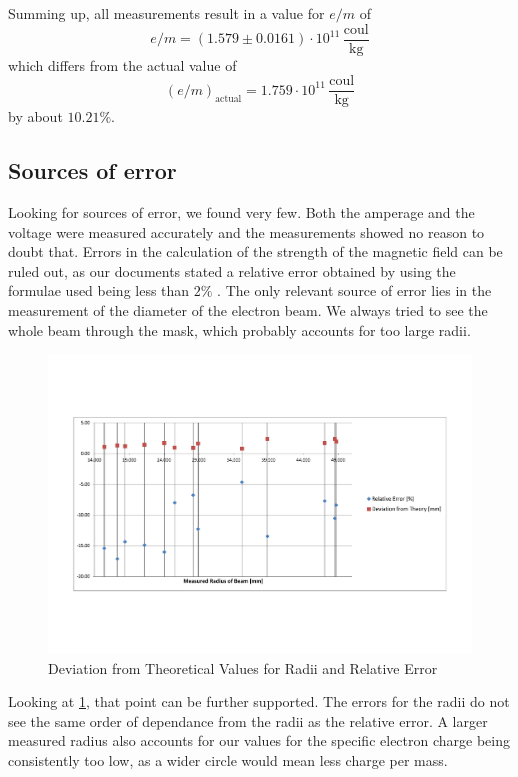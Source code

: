 \documentclass{scrreprt}
\newcommand{\unit}[1]{\ensuremath{\, \mathrm{#1}}}
\begin{document}
Summing up, all measurements result in a value for $e/m$ of
\begin{equation}
e/m = \left( 1.579 \pm 0.0161 \right)\cdot 10^{11} \unit{\frac{coul}{kg}}
\end{equation}
which differs from the actual value of 
\begin{equation}
(e/m)_{\text{actual}} = 1.759 \cdot 10^{11} \unit{\frac{coul}{kg}}
\end{equation}
by about $10.21\%$.

\subsection{Sources of error}
\label{sec:error}
Looking for sources of error, we found very few. Both the amperage and the voltage were measured accurately and the measurements showed no reason to doubt that. Errors in the calculation of the strength of the magnetic field can be ruled out, as our documents stated a relative error obtained by using the formulae used being less than $2\%$ \cite[p. 174]{physcript13}. 
The only relevant source of error lies in the measurement of the diameter of the electron beam. We always tried to see the whole beam through the mask, which probably accounts for too large radii. 
\begin{figure}[H]
	\centering
  \includegraphics[width=1.0\textwidth]{diag/errors.pdf}
	\caption{Deviation from Theoretical Values for Radii and Relative Error}
	\label{fig:error}
\end{figure}

Looking at \ref{fig:error}, that point can be further supported. The errors for the radii do not see the same order of dependance from the radii as the relative error. A larger measured radius also accounts for our values for the specific electron charge being consistently too low, as a wider circle would mean less charge per mass.
\end{document}
